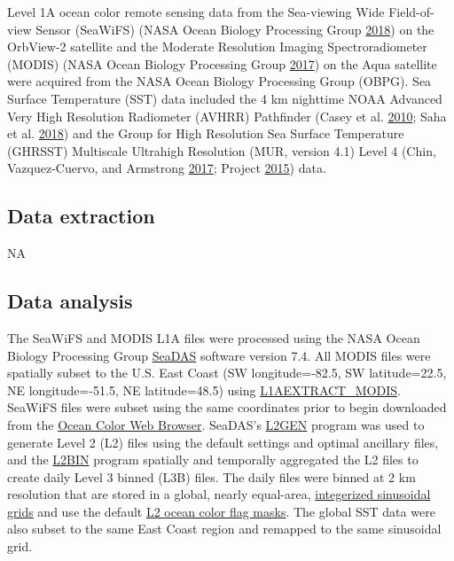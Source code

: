 \documentclass[
]{book}
\begin{document}
Level 1A ocean color remote sensing data from the Sea-viewing Wide Field-of-view Sensor (SeaWiFS) (NASA Ocean Biology Processing Group \protect\hyperlink{ref-NASA1}{2018}) on the OrbView-2 satellite and the Moderate Resolution Imaging Spectroradiometer (MODIS) (NASA Ocean Biology Processing Group \protect\hyperlink{ref-NASA2}{2017}) on the Aqua satellite were acquired from the NASA Ocean Biology Processing Group (OBPG). Sea Surface Temperature (SST) data included the 4 km nighttime NOAA Advanced Very High Resolution Radiometer (AVHRR) Pathfinder (Casey et al. \protect\hyperlink{ref-Casey2010}{2010}; Saha et al. \protect\hyperlink{ref-Saha2018}{2018}) and the Group for High Resolution Sea Surface Temperature (GHRSST) Multiscale Ultrahigh Resolution (MUR, version 4.1) Level 4 (Chin, Vazquez-Cuervo, and Armstrong \protect\hyperlink{ref-SOE4}{2017}; Project \protect\hyperlink{ref-SOE14}{2015}) data.

\hypertarget{data-extraction-7}{%
\subsection{Data extraction}\label{data-extraction-7}}

NA

\hypertarget{data-analysis-7}{%
\subsection{Data analysis}\label{data-analysis-7}}

The SeaWiFS and MODIS L1A files were processed using the NASA Ocean Biology Processing Group \href{https://seadas.gsfc.nasa.gov/}{SeaDAS} software version 7.4. All MODIS files were spatially subset to the U.S. East Coast (SW longitude=-82.5, SW latitude=22.5, NE longitude=-51.5, NE latitude=48.5) using \href{https://seadas.gsfc.nasa.gov/help/seadas-processing/ProcessL1aextract_modis.html}{L1AEXTRACT\_MODIS}. SeaWiFS files were subset using the same coordinates prior to begin downloaded from the \href{https://oceancolor.gsfc.nasa.gov/cgi/browse.pl?sen=am}{Ocean Color Web Browser}. SeaDAS's \href{https://seadas.gsfc.nasa.gov/help/seadas-processing/ProcessL2gen.html}{L2GEN} program was used to generate Level 2 (L2) files using the default settings and optimal ancillary files, and the \href{https://seadas.gsfc.nasa.gov/help/seadas-processing/ProcessL2bin.html}{L2BIN} program spatially and temporally aggregated the L2 files to create daily Level 3 binned (L3B) files. The daily files were binned at 2 km resolution that are stored in a global, nearly equal-area, \href{https://oceancolor.gsfc.nasa.gov/docs/format/l3bins/}{integerized sinusoidal grids} and use the default \href{https://oceancolor.gsfc.nasa.gov/atbd/ocl2flags/}{L2 ocean color flag masks}. The global SST data were also subset to the same East Coast region and remapped to the same sinusoidal grid.
\end{document}
